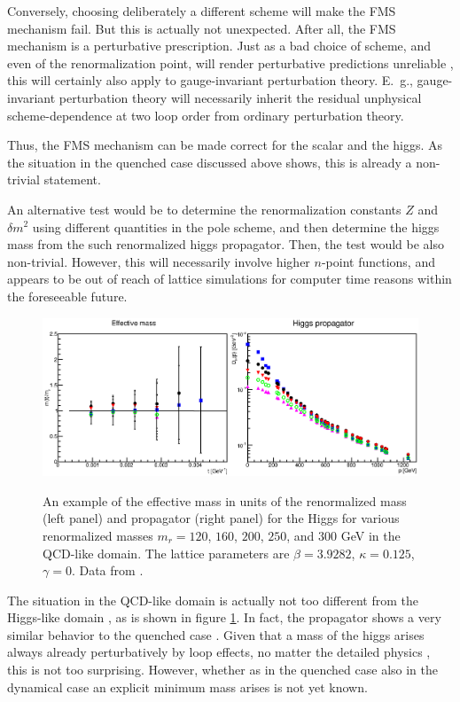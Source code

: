 \documentclass[final,12pt]{article}
\newcommand*{\1}{1\!\!\!\bot}
\begin{document}
Conversely, choosing deliberately a different scheme will make the FMS mechanism fail. But this is actually not unexpected. After all, the FMS mechanism is a perturbative prescription. Just as a bad choice of scheme, and even of the renormalization point, will render perturbative predictions unreliable \cite{BeiglboCk:2006lfa,Baglio:2011wn,Baglio:2011hc}, this will certainly also apply to gauge-invariant perturbation theory. E.\ g., gauge-invariant perturbation theory will necessarily inherit the residual unphysical scheme-dependence at two loop order from ordinary perturbation theory.

Thus, the FMS mechanism can be made correct for the scalar and the higgs. As the situation in the quenched case discussed above shows, this is already a non-trivial statement.

An alternative test would be to determine the renormalization constants $Z$ and $\delta m^2$ using different quantities in the pole scheme, and then determine the higgs mass from the such renormalized higgs propagator. Then, the test would be also non-trivial. However, this will necessarily involve higher $n$-point functions, and appears to be out of reach of lattice simulations for computer time reasons within the foreseeable future.

\begin{figure}
\includegraphics[width=\linewidth]{h-qcd}\\
\caption{\label{fig:h-qcd}An example of the effective mass in units of the renormalized mass (left panel) and propagator (right panel) for the Higgs for various renormalized masses $m_r=120$, $160$, $200$, $250$, and $300$ GeV in the QCD-like domain. The lattice parameters are $\beta=3.9282$, $\kappa=0.125$, $\gamma=0$. Data from \cite{Maas:2013aia,Maas:unpublished}.}
\end{figure}

The situation in the QCD-like domain is actually not too different from the Higgs-like domain \cite{Benes:2008ir,Fister:2010yw,Gies:2015lia,Maas:2013aia}, as is shown in figure \ref{fig:h-qcd}. In fact, the propagator shows a very similar behavior to the quenched case \cite{Maas:2016edk}. Given that a mass of the higgs arises always already perturbatively by loop effects, no matter the detailed physics \cite{Bohm:2001yx}, this is not too surprising. However, whether as in the quenched case also in the dynamical case an explicit minimum mass arises is not yet known.
\end{document}
